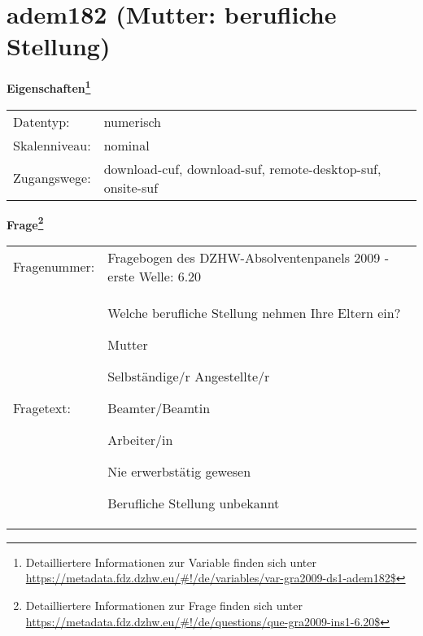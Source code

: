 
    \setcounter{footnote}{0}

    \vspace*{-1.8cm}
	\section{adem182 (Mutter: berufliche Stellung)}
	\label{section:adem182}



    \vspace*{0.5cm}
    \noindent\textbf{Eigenschaften\footnote{Detailliertere Informationen zur Variable finden sich unter
		\url{https://metadata.fdz.dzhw.eu/\#!/de/variables/var-gra2009-ds1-adem182$}}}\\
	\begin{tabularx}{\hsize}{@{}lX}
	Datentyp: & numerisch \\
	Skalenniveau: & nominal \\
	Zugangswege: &
	  download-cuf, 
	  download-suf, 
	  remote-desktop-suf, 
	  onsite-suf
 \\
    \end{tabularx}



				\vspace*{0.5cm}
                \noindent\textbf{Frage\footnote{Detailliertere Informationen zur Frage finden sich unter
		              \url{https://metadata.fdz.dzhw.eu/\#!/de/questions/que-gra2009-ins1-6.20$}}}\\
				\begin{tabularx}{\hsize}{@{}lX}
					Fragenummer: &
					  Fragebogen des DZHW-Absolventenpanels 2009 - erste Welle:
					  6.20
 \\
					Fragetext: & Welche berufliche Stellung nehmen Ihre Eltern ein?\par  Mutter\par  Selbständige/r Angestellte/r\par  Beamter/Beamtin\par  Arbeiter/in\par  Nie erwerbstätig gewesen\par  Berufliche Stellung unbekannt \\
				\end{tabularx}





